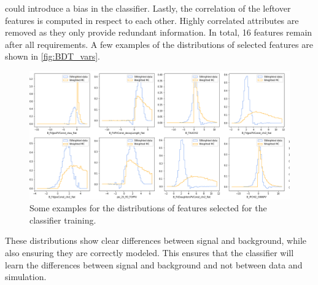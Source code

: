 could introduce a bias in the classifier. Lastly, the correlation of the leftover features is computed in respect to each other. Highly correlated attributes are removed as they
only provide redundant information. In total, 16 features remain after all requirements.
A few examples of the distributions of selected features are shown in \autoref{fig:BDT_vars}.
\begin{figure}[H]
	\centering
	\includegraphics[width=0.8\linewidth]{plots/BDT_variables.png}
	\caption{Some examples for the distributions of features selected for the classifier training.}
	\label{fig:BDT_vars}
\end{figure}
These distributions show clear differences between signal and background, while also ensuring they are correctly modeled. This ensures that the classifier will learn the
differences between signal and background and not between data and simulation.

